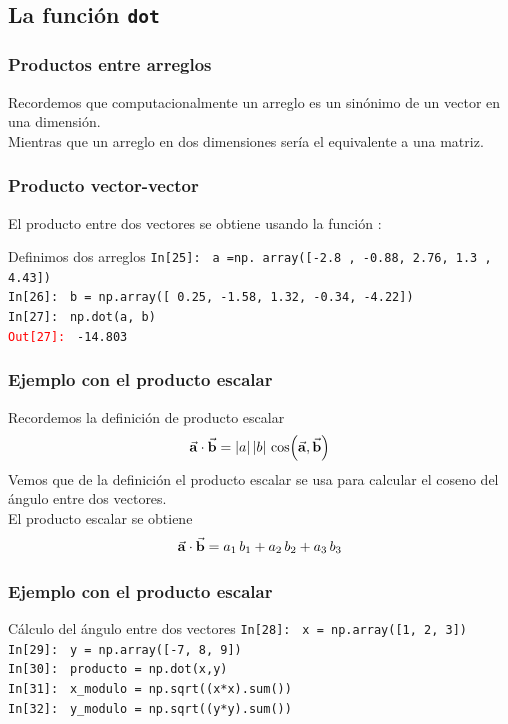 \subsection{La función \texttt{dot}}
\begin{frame}
\frametitle{Productos entre arreglos}
Recordemos que computacionalmente un arreglo es un sinónimo de un vector en una dimensión.
\\
\bigskip
Mientras que un arreglo en dos dimensiones sería el equivalente a una matriz.
\end{frame}
\begin{frame}[fragile]
\frametitle{Producto vector-vector}
El producto entre dos vectores se obtiene usando la función :
\fontsize{12}{12}\selectfont
\begin{exampleblock}{Definimos dos arreglos}
\textcolor{ao}{\texttt{In[25]: }} \texttt{a =np. array([-2.8 , -0.88,  2.76,  1.3 ,  4.43])} \\
\medskip
\pause
\textcolor{ao}{\texttt{In[26]: }} \texttt{b = np.array([ 0.25, -1.58,  1.32, -0.34, -4.22])} \\
\medskip
\pause
\textcolor{ao}{\texttt{In[27]: }} \texttt{np.dot(a, b)} \\
\medskip
\pause
\textcolor{red}{\texttt{Out[27]: }} \texttt{-14.803}
\end{exampleblock}
\end{frame}
\begin{frame}[fragile]
\frametitle{Ejemplo con el producto escalar}
Recordemos la definición de producto escalar
\begin{align*}
\va{a} \cdot \va{b} = \abs{a} \, \abs{b} \, \cos(\va{a}, \va{b})
\end{align*}
Vemos que de la definición el producto escalar se usa para calcular el coseno del ángulo entre dos vectores.
\\
\bigskip
\pause
El producto escalar se obtiene
\begin{align*}
\va{a} \cdot \va{b} = a_{1} \, b_{1} + a_{2} \, b_{2} + a_{3} \, b_{3}
\end{align*}
\end{frame}
\begin{frame}  
\frametitle{Ejemplo con el producto escalar}
\fontsize{12}{12}\selectfont
\begin{exampleblock}{Cálculo del ángulo entre dos vectores}
\textcolor{ao}{\texttt{In[28]: }} \texttt{x = np.array([1, 2, 3])} \\
\medskip
\pause
\textcolor{ao}{\texttt{In[29]: }} \texttt{y = np.array([-7, 8, 9])} \\
\medskip
\pause
\textcolor{ao}{\texttt{In[30]: }} \texttt{producto = np.dot(x,y)} \\
\medskip
\pause
\textcolor{ao}{\texttt{In[31]: }} \texttt{x\_modulo = np.sqrt((x*x).sum())} \\
\medskip
\pause
\textcolor{ao}{\texttt{In[32]: }} \texttt{y\_modulo = np.sqrt((y*y).sum())}
\end{exampleblock}
\end{frame}
